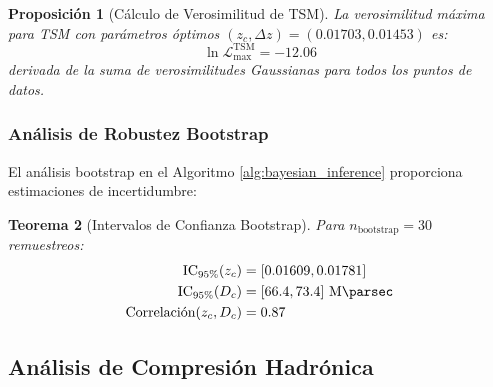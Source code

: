 \documentclass[11pt, a4paper]{article}
\theoremstyle{plain}
\newtheorem{teorema}{Teorema}[section]
\newtheorem{proposicion}[teorema]{Proposición}
\theoremstyle{definition}
\begin{document}
\begin{proposicion}[Cálculo de Verosimilitud de TSM]
La verosimilitud máxima para TSM con parámetros óptimos $(z_c, \Delta z) = (0.01703, 0.01453)$ es:
\begin{equation}
\ln\mathcal{L}_{\text{max}}^{\text{TSM}} = -12.06
\end{equation}
derivada de la suma de verosimilitudes Gaussianas para todos los puntos de datos.
\end{proposicion}

\subsubsection{Análisis de Robustez Bootstrap}

El análisis bootstrap en el Algoritmo \ref{alg:bayesian_inference} proporciona estimaciones de incertidumbre:

\begin{teorema}[Intervalos de Confianza Bootstrap]
Para $n_{\text{bootstrap}} = 30$ remuestreos:
\begin{align}
\text{IC}_{95\%}(z_c) &= [0.01609, 0.01781] \\
\text{IC}_{95\%}(D_c) &= [66.4, 73.4]\ \si{\mega\parsec} \\
\text{Correlación}(z_c, D_c) &= 0.87
\end{align}
\end{teorema}

\subsection{Análisis de Compresión Hadrónica}
\label{app:analisis_hadronico}
\end{document}
